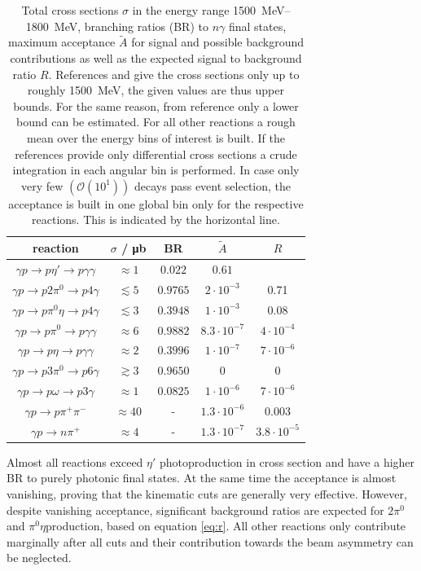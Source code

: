 \begin{table}[htbp]
	\centering
	\begin{tabular}{ccccc}
		\toprule
		reaction & $\sigma$ / \si{\micro\barn} & BR\cite{pdg} & $\tilde{A}$&$R$\\
		\hline
		$\gamma p\to p\eta'\to p\gamma\gamma$ &$\approx1$ \cite{etap_cs}& $0.022$ & $0.61$&\\
		$\gamma p\to p2\pi^0\to p4\gamma$ &$\lesssim5$ \cite{2pi0_cs}&$0.9765$& $2\cdot10^{-3}$&0.71\\
		$\gamma p\to p\pi^0\eta\to p 4\gamma$ &$\lesssim3$ \cite{pi0eta_cs} &$0.3948$&$1\cdot 10^{-3}$&0.08\\
		\hline
		$\gamma p \to p\pi^0\to p\gamma\gamma$&$\approx 6$\cite{pi0_cs2}&$0.9882$&$8.3\cdot10^{-7}$&$4\cdot10^{-4}$\\
		$\gamma p \to p\eta\to p\gamma\gamma$&$\approx 2$ \cite{etap_cs}&$0.3996$&$1\cdot10^{-7}$&$7\cdot10^{-6}$\\
		$\gamma p \to p3\pi^0\to p6\gamma$&$\gtrsim 3$\cite{3pi0cs} &$0.9650$&0&0\\
		$\gamma p \to p\omega \to p3\gamma$&$\approx 1$ \cite{omegacs}&$0.0825$&$1\cdot10^{-6}$&$7\cdot10^{-6}$\\
		$\gamma p \to p\pi^+\pi^-$&$\approx40$ \cite{pipics}&-&$1.3\cdot 10^{-6}$&$0.003$\\
		$\gamma p \to n\pi^+$&$\approx 4$ \cite{npiplcs}&-&$1.3\cdot10^{-7}$&$3.8\cdot10^{-5}$\\
		\bottomrule 		
	\end{tabular}
\caption{Total cross sections $\sigma$ in the energy range \SIrange{1500}{1800}{\mega\eV}, branching ratios (BR) to $n\gamma$ final states, maximum acceptance $\tilde{A}$ for signal and possible background contributions as well as the expected signal to background ratio $R$. References \cite{2pi0_cs} and \cite{pi0eta_cs} give the cross sections only up to roughly \SI{1500}{\mega\eV}, the given values are thus upper bounds. For the same reason, from reference \cite{3pi0cs} only a lower bound can be estimated. For all other reactions a rough mean over the energy bins of interest is built. If the references provide only differential cross sections a crude integration in each angular bin is performed. In case only very few $\left(\mathcal{O}\left(10^1\right)\right)$ decays pass event selection, the acceptance is built in one global bin only for the respective reactions. This is indicated by the horizontal line.}
\label{tab:plausmc}
\end{table}
\noindent Almost all reactions exceed $\eta'$ photoproduction in cross section and have a higher BR to purely photonic final states. At the same time the acceptance is almost vanishing, proving that the kinematic cuts are generally very effective. However, despite vanishing acceptance, significant background ratios are expected for $2\pi^0$ and $\pi^0\eta$production, based on equation \eqref{eq:r}. All other reactions only contribute marginally after all cuts and their contribution towards the beam asymmetry can be neglected.  

